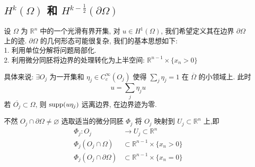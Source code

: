 \documentclass[11pt]{ctexart}[UTF8]
\begin{document}
\subsection{$H^{k}(\Omega)$ 和 $H^{k-\frac{1}{2}}(\partial \Omega)$}
设 $\Omega$ 为 $\mathbb{R}^n$ 中的一个光滑有界开集, 对 $u \in H^1(\Omega)$, 我们希望定义其在边界 $\partial \Omega$ 上的迹. $\partial \Omega$ 的几何形态可能很复杂, 我们的基本思想如下:\\
1. 利用单位分解将问题局部化.\\
2. 利用微分同胚将边界的处理转化为上半空间: $\mathbb{R}^{n-1} \times \{ x_{n} > 0 \}$\par
具体来说: $\exists O_{j}$ 为一开集和 $\eta_{j} \in C_{c}^{\infty}(O_j)$ 使得 $\sum\limits_{j} \eta_{j} = 1$ 在 $\overline{\Omega}$ 的小领域上. 此时
$$u = \sum\limits_{j} \eta_{j} u$$
若 $\overline{O_{j}} \subset \Omega$, 则 $\operatorname{supp}(u\eta_{j})$ 远离边界, 在边界迹为零.\par
不然 $O_{j} \cap \partial \Omega \neq \varnothing$ 选取适当的微分同胚 $\Phi_{j}$ 将 $O_{j}$ 映射到 $U_{j} \subset \mathbb{R}^{n}$ 上,即
\begin{equation*}
    \begin{aligned}
        \Phi_{j}: O_{j} &\longrightarrow U_{j} \subset \mathbb{R}^{n}\\
        \Phi_{j}(O_{j} \cap \Omega) &\subset \mathbb{R}^{n-1} \times \{ x_{n} > 0 \}\\
        \Phi_{j}(O_{j} \cap \partial \Omega) &\subset \mathbb{R}^{n-1} \times \{ x_{n} = 0 \}
    \end{aligned}
\end{equation*}
\end{document}
